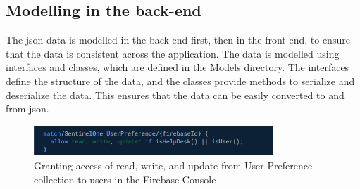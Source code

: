 \begin{multicols}{2}
      \subsection{Modelling in the back-end}
      The \acrshort{json} data is modelled in the back-end first, then in the front-end, to ensure that the data is consistent across the
      application. The data is modelled using interfaces and classes, which are defined in the Models directory. The interfaces define the
      structure of the data, and the classes provide methods to serialize and deserialize the data. This ensures that the data can be easily
      converted to and from \acrshort{json}.

\end{multicols}

\begin{figure}[htbp]
      \centering
      \includegraphics[width=0.8\textwidth]{Figures/User Preference.png}
      \caption{Granting access of read, write, and update from User Preference collection to users in the Firebase Console}
\end{figure}


